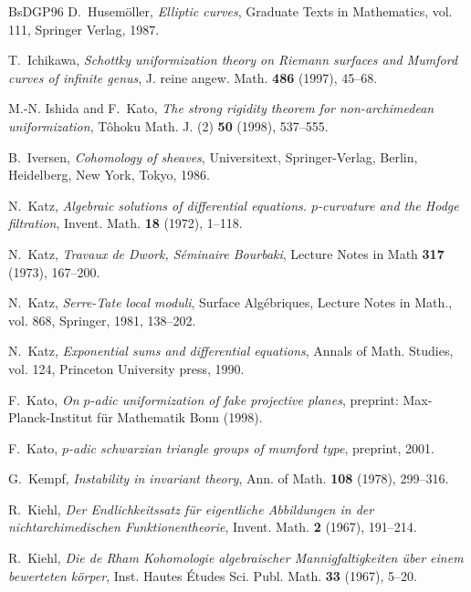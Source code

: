 \begin{thebibliography}{BsDGP96}
D.~Husem\"oller, \emph{Elliptic curves}, Graduate Texts in Mathematics, vol.
  111, Springer Verlag, 1987.

T.~Ichikawa, \emph{Schottky uniformization theory on {R}iemann surfaces and
  {M}umford curves of infinite genus}, J. reine angew. Math. \textbf{486}
  (1997), 45--68.

M.-N. Ishida and F.~Kato, \emph{The strong rigidity theorem for non-archimedean
  uniformization}, T{\^o}hoku Math. J. (2) \textbf{50} (1998), 537--555.

B.~Iversen, \emph{Cohomology of sheaves}, Universitext, Springer-Verlag,
  Berlin, Heidelberg, New York, Tokyo, 1986.

N.~Katz, \emph{Algebraic solutions of differential equations. $p$-curvature and
  the {H}odge filtration}, Invent. Math. \textbf{18} (1972), 1--118.

N.~Katz, \emph{Travaux de {D}work, {S}\'eminaire {B}ourbaki}, Lecture Notes in
  Math \textbf{317} (1973), 167--200.

N.~Katz, \emph{Serre-{T}ate local moduli}, Surface Alg\'ebriques, Lecture Notes
  in Math., vol. 868, Springer, 1981, 138--202.

N.~Katz, \emph{Exponential sums and differential equations}, Annals of Math.
  Studies, vol. 124, Princeton University press, 1990.

F.~Kato, \emph{On $p$-adic uniformization of fake projective planes}, preprint:
  Max-Planck-Institut f\"ur Mathematik Bonn (1998).

F.~Kato, \emph{$p$-adic schwarzian triangle groups of mumford type}, preprint,
  2001.

G.~Kempf, \emph{Instability in invariant theory}, Ann. of Math. \textbf{108}
  (1978), 299--316.

R.~Kiehl, \emph{Der {E}ndlichkeitssatz f{\"u}r eigentliche {A}bbildungen in der
  nichtarchimedischen {F}unktionentheorie}, Invent. Math. \textbf{2} (1967),
  191--214.

R.~Kiehl, \emph{Die de {R}ham {K}ohomologie algebraischer {M}annigfaltigkeiten
  \"uber einem bewerteten k\"orper}, Inst. Hautes {\'E}tudes Sci. Publ. Math.
  \textbf{33} (1967), 5--20.


\end{thebibliography}
